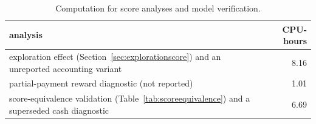 \begin{table}[!htbp]
\centering
\caption{Computation for score analyses and model verification.}
\label{tab:auxiliarycompute}
\small
\begin{tabular}{lr}
\toprule
analysis & CPU-hours \\
\midrule
exploration effect (Section~\ref{sec:explorationscore}) and an unreported accounting variant & 8.16 \\
partial-payment reward diagnostic (not reported) & 1.01 \\
score-equivalence validation (Table~\ref{tab:scoreequivalence}) and a superseded cash diagnostic & 6.69 \\
\bottomrule
\end{tabular}
\end{table}
